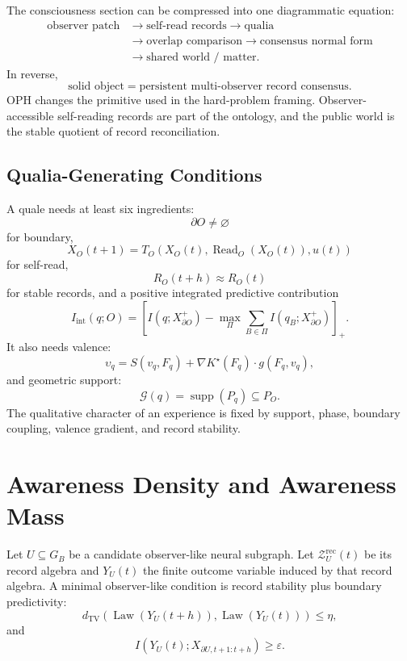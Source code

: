 \documentclass[11pt]{article}
\theoremstyle{remark}
\theoremstyle{plain}
\newcommand{\TV}{\mathrm{TV}}
\newcommand{\rec}{\mathrm{rec}}
\newcommand{\bd}{\partial}
\begin{document}
The consciousness section can be compressed into one diagrammatic equation:
\[
\boxed{
\begin{aligned}
\text{observer patch}
&\longrightarrow \text{self-read records}
\longrightarrow \text{qualia}\\
&\longrightarrow \text{overlap comparison}
\longrightarrow \text{consensus normal form}\\
&\longrightarrow \text{shared world / matter}.
\end{aligned}
}
\]
In reverse,
\[
\boxed{
\text{solid object}
=
\text{persistent multi-observer record consensus}.
}
\]
OPH changes the primitive used in the hard-problem framing. Observer-accessible self-reading records are part of the ontology, and the public world is the stable quotient of record reconciliation.

\subsection{Qualia-Generating Conditions}

A quale needs at least six ingredients:
\[
\partial O\ne\varnothing
\]
for boundary,
\[
X_O(t+1)=T_O(X_O(t),\operatorname{Read}_O(X_O(t)),u(t))
\]
for self-read,
\[
R_O(t+h)\approx R_O(t)
\]
for stable records, and a positive integrated predictive contribution
\[
I_{\mathrm{int}}(q;O)
=
\left[
I(q;X_{\partial O}^{+})
-
\max_{\Pi}\sum_{B\in\Pi}I(q_B;X_{\partial O}^{+})
\right]_+.
\]
It also needs valence:
\[
\upsilon_q
=
S(v_q,F_q)+\nabla K^\star(F_q)\cdot g(F_q,v_q),
\]
and geometric support:
\[
\mathcal G(q)=\operatorname{supp}(P_q)\subseteq P_O.
\]
The qualitative character of an experience is fixed by support, phase, boundary coupling, valence gradient, and record stability.

\section{Awareness Density and Awareness Mass}

Let \(U\subseteq G_B\) be a candidate observer-like neural subgraph. Let \(\mathcal Z_U^{\rec}(t)\) be its record algebra and \(Y_U(t)\) the finite outcome variable induced by that record algebra. A minimal observer-like condition is record stability plus boundary predictivity:
\[
d_{\TV}\!\left(
\operatorname{Law}(Y_U(t+h)),
\operatorname{Law}(Y_U(t))
\right)
\le \eta,
\]
and
\[
I\!\left(
Y_U(t);
X_{\bd U,t+1:t+h}
\right)
\ge \varepsilon.
\]
\end{document}
